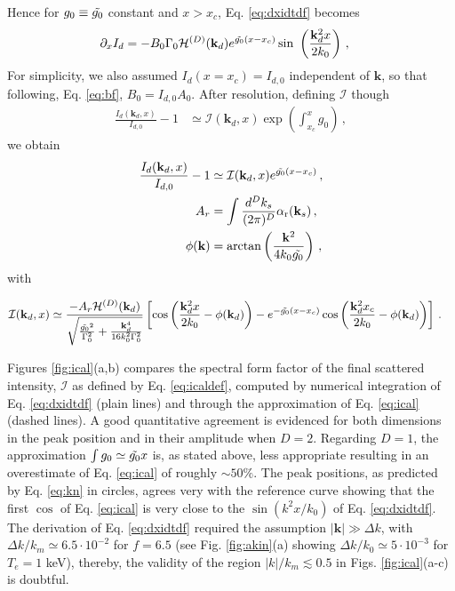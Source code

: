 \documentclass[
 reprint,
 amsmath,amssymb,
 aps,
]{revtex4-1}
\begin{document}
Hence for $g_0\equiv \Tilde{g_0}$ constant and $x>x_c$, Eq. \eqref{eq:dxidtdf} becomes
\begin{align}
   \partial_x I_d&=-B_0\Gamma_0 \mathcal{H}^{(D)}(\mathbf{k}_d)e^{  \Tilde{g_0}(x-x_c)} 
    \sin\ \left(\frac{\mathbf{k}_d^2x }{2k_0}  \right)   \, , \label{eq:idtd1} 
\end{align}
For simplicity, we also assumed $I_d(x=x_c)=I_{d,0}$ independent of $\mathbf{k}$, so that following, Eq. \eqref{eq:bf}, $B_0 = I_{d,0}A_0$.
After resolution, defining $\mathcal{I}$ though
\begin{align}
    \frac{I_d(\mathbf{k}_d,x)}{I_{d,0}}-1& \simeq
   \mathcal{I}(\mathbf{k}_d,x)
   \exp\left(\int_{x_c}^{x}g_0\right)
    \, , \label{eq:icaldef} 
\end{align}
we obtain
\begin{align}
    \frac{I_d(\mathbf{k}_d,x)}{I_{d,0}}-1& \simeq
   \mathcal{I}(\mathbf{k}_d,x)
   e^{\Tilde{g_0}(x-x_c)}
    \, , \label{eq:idf} \\
    A_r &= \int \frac{d^Dk_s}{(2\pi)^D}    \alpha_\mathrm{r}(\mathbf{k}_s) \, ,\label{eq:ar}\\
    \phi(\mathbf{k}) &= \arctan \left(  \frac{\mathbf{k}^2}{4k_0\Tilde{g_0}}\right)\, , \label{eq:phi}
\end{align}
with 
\begin{widetext}
\begin{align}
    \mathcal{I}(\mathbf{k}_d,x)& \simeq
   \frac{
   -A_r  \mathcal{H}^{(D)}(\mathbf{k}_d)
   }{
   \sqrt{\frac{\Tilde{g_0}^2}{\Gamma_0^2}  +\frac{\mathbf{k}_d^4 }{16k_0^2 \Gamma_0^2}}
    } 
    \left[
    \cos\left( \frac{\mathbf{k}_d^2x }{2k_0}  -\phi(\mathbf{k}_d) \right) 
   -e^{-\Tilde{g_0}(x-x_c)}\cos\left( \frac{\mathbf{k}_d^2x_c }{2k_0}  -\phi(\mathbf{k}_d) \right) 
    \right]
    \, . \label{eq:ical} 
\end{align}
\end{widetext}
Figures \ref{fig:ical}(a,b) compares the spectral form factor of the final scattered intensity, $\mathcal{I}$ as defined by Eq. \eqref{eq:icaldef}, computed by numerical integration of Eq. \eqref{eq:dxidtdf} (plain lines) and through the approximation of Eq. \eqref{eq:ical} (dashed lines). A good quantitative agreement is evidenced for  both dimensions in the peak position and in their amplitude when $D=2$. 
Regarding $D=1$, the approximation $\int g_0\simeq  \Tilde{g_0} x$ is, as stated above,   less appropriate resulting in an overestimate of Eq. \eqref{eq:ical} of roughly $\sim 50\%$. 
The peak positions, as predicted by Eq. \eqref{eq:kn} in circles, agrees very with the reference curve showing that the first  $\cos$ of Eq. \eqref{eq:ical} is very close to the $\sin(k^2x/k_0)$ of Eq. \eqref{eq:dxidtdf}.
The derivation of Eq. \eqref{eq:dxidtdf} required the assumption $\vert \mathbf{k}\vert\gg \Delta k $, with  
$\Delta k/k_m \simeq 6.5\cdot 10^{-2}$ for $f=6.5$ (see Fig. \ref{fig:akin}(a) showing $\Delta k/k_0 \simeq 5\cdot 10^{-3}$ for $T_e=1$ keV), thereby, the validity of the region  $\vert k\vert /k_m \lesssim 0.5$ in Figs. \ref{fig:ical}(a-c) is doubtful. 
\end{document}
